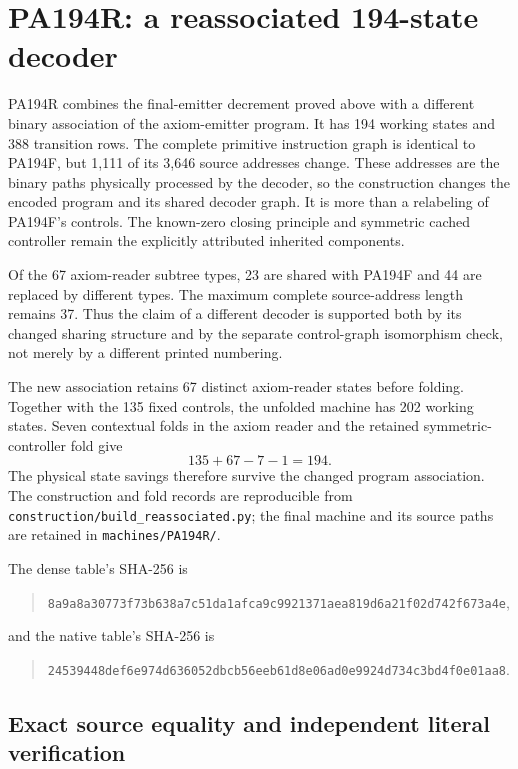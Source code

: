\section{PA194R: a reassociated 194-state decoder}
\label{sec:pa194r}

PA194R combines the final-emitter decrement proved above with a different
binary association of the axiom-emitter program. It has 194 working
states and 388 transition rows. The complete primitive instruction
graph is identical to PA194F, but 1,111 of its 3,646 source addresses
change. These addresses are the binary paths physically processed by
the decoder, so the construction changes the encoded program and its
shared decoder graph. It is more than a relabeling of PA194F's controls.
The known-zero closing principle and symmetric cached controller remain
the explicitly attributed inherited components.

Of the 67 axiom-reader subtree types, 23 are shared with PA194F and
44 are replaced by different types. The maximum complete source-address
length remains 37. Thus the claim of a different decoder is supported
both by its changed sharing structure and by the separate control-graph
isomorphism check, not merely by a different printed numbering.

The new association retains 67 distinct axiom-reader states before
folding. Together with the 135 fixed controls, the unfolded machine has
202 working states. Seven contextual folds in the axiom reader and the
retained symmetric-controller fold give
\[
                         135+67-7-1=194.
\]
The physical state savings therefore survive the changed program
association. The construction and fold records are reproducible from
\texttt{construction/build\_reassociated.py}; the final machine and
its source paths are retained in \texttt{machines/PA194R/}.

The dense table's SHA-256 is
\begin{quote}\small\ttfamily
\nolinkurl{8a9a8a30773f73b638a7c51da1afca9c9921371aea819d6a21f02d742f673a4e},
\end{quote}
and the native table's SHA-256 is
\begin{quote}\small\ttfamily
\nolinkurl{24539448def6e974d636052dbcb56eeb61d8e06ad0e9924d734c3bd4f0e01aa8}.
\end{quote}

\subsection{Exact source equality and independent literal verification}

